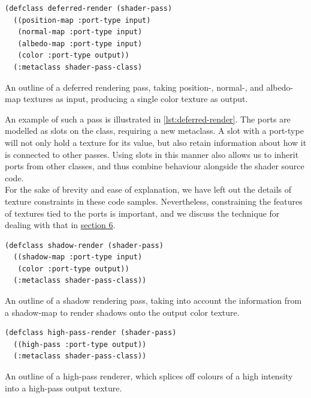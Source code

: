 \documentclass[format=sigconf]{acmart}
\begin{document}
\begin{listing}[h]
\begin{verbatim}
(defclass deferred-render (shader-pass)
  ((position-map :port-type input)
   (normal-map :port-type input)
   (albedo-map :port-type input)
   (color :port-type output))
  (:metaclass shader-pass-class)
\end{verbatim}
\caption{An outline of a deferred rendering pass, taking position-, normal-, and albedo-map textures as input, producing a single color texture as output.}
\label{lst:deferred-render}
\end{listing}

An example of such a pass is illustrated in \autoref{lst:deferred-render}. The ports are modelled as slots on the class, requiring a new metaclass. A slot with a port-type will not only hold a texture for its value, but also retain information about how it is connected to other passes. Using slots in this manner also allows us to inherit ports from other classes, and thus combine behaviour alongside the shader source code. \\

For the sake of brevity and ease of explanation, we have left out the details of texture constraints in these code samples. Nevertheless, constraining the features of textures tied to the ports is important, and we discuss the technique for dealing with that in \hyperref[allocation]{section 6}.

\begin{listing}[h]
\begin{verbatim}
(defclass shadow-render (shader-pass)
  ((shadow-map :port-type input)
   (color :port-type output))
  (:metaclass shader-pass-class))
\end{verbatim}
\caption{An outline of a shadow rendering pass, taking into account the information from a shadow-map to render shadows onto the output color texture.}
\label{lst:shadow-render}
\end{listing}

\begin{listing}[h]
\begin{verbatim}
(defclass high-pass-render (shader-pass)
  ((high-pass :port-type output))
  (:metaclass shader-pass-class))
\end{verbatim}
\caption{An outline of a high-pass renderer, which splices off colours of a high intensity into a high-pass output texture.}
\label{lst:high-pass}
\end{listing}
\end{document}
